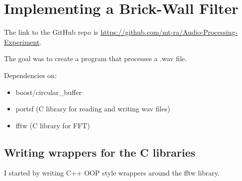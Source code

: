 \section{Implementing a Brick-Wall Filter}

The link to the GitHub repo is \href{https://github.com/mt-ra/Audio-Processing-Experiment}{https://github.com/mt-ra/Audio-Processing-Experiment}.

The goal was to create a program that processes a .wav file.

Dependencies on:
\begin{itemize}
    \item boost/circular\_buffer
    \item portsf (C library for reading and writing wav files)
    \item fftw (C library for FFT)
\end{itemize}

\subsection{Writing wrappers for the C libraries}
I started by writing C++ OOP style wrappers around the fftw library.